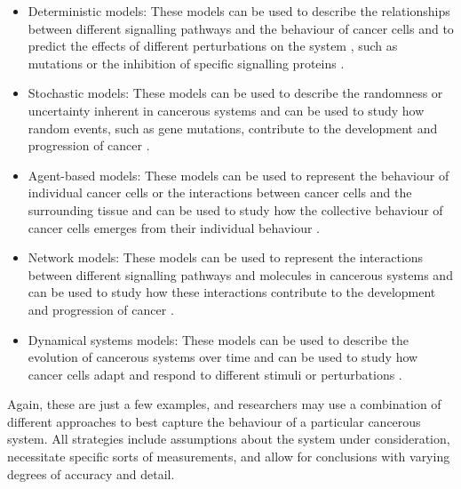 \begin{itemize}
    \item Deterministic models: These models can be used to describe the relationships between different signalling pathways and the behaviour of cancer cells and to predict the effects of different perturbations on the system \cite{altrock2015mathematics}, such as mutations or the inhibition of specific signalling proteins \cite{tabassum2019mathematical}.

    \item Stochastic models: These models can be used to describe the randomness or uncertainty inherent in cancerous systems and can be used to study how random events, such as gene mutations, contribute to the development and progression of cancer \cite{tsodikov1996stochastic}.

    \item Agent-based models: These models can be used to represent the behaviour of individual cancer cells or the interactions between cancer cells and the surrounding tissue and can be used to study how the collective behaviour of cancer cells emerges from their individual behaviour \cite{figueredo2013investigating}.

    \item Network models: These models can be used to represent the interactions between different signalling pathways and molecules in cancerous systems and can be used to study how these interactions contribute to the development and progression of cancer \cite{ji2020mathematical}.

    \item Dynamical systems models: These models can be used to describe the evolution of cancerous systems over time and can be used to study how cancer cells adapt and respond to different stimuli or perturbations \cite{haupt2021mathematical}.
\end{itemize}

Again, these are just a few examples, and researchers may use a combination of different approaches to best capture the behaviour of a particular cancerous system. All strategies include assumptions about the system under consideration, necessitate specific sorts of measurements, and allow for conclusions with varying degrees of accuracy and detail.







